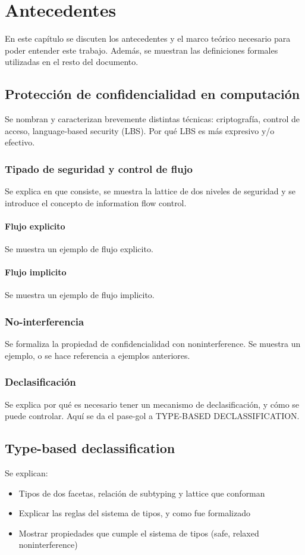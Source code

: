 \chapter{Antecedentes}

En este capítulo se discuten los antecedentes y el marco teórico necesario para poder entender este trabajo. Además, se muestran las definiciones formales utilizadas en el resto del documento.

\section{Protección de confidencialidad en computación}
Se nombran y caracterizan brevemente distintas técnicas: criptografía, control de acceso, language-based security (LBS). Por qué LBS es más expresivo y/o efectivo.

\subsection{Tipado de seguridad y control de flujo}
Se explica en que consiste, se muestra la lattice de dos niveles de seguridad y se introduce el concepto de information flow control.
\subsubsection{Flujo explicito}
Se muestra un ejemplo de flujo explicito.
\subsubsection{Flujo implicito}
Se muestra un ejemplo de flujo implicito.
\subsection{No-interferencia}
Se formaliza la propiedad de confidencialidad con noninterference. Se muestra un ejemplo, o se hace referencia a ejemplos anteriores.

\subsection{Declasificación}
Se explica por qué es necesario tener un mecanismo de declasificación, y cómo se puede controlar. Aquí se da el pase-gol a TYPE-BASED DECLASSIFICATION.
\section{Type-based declassification}
Se explican:
\begin{itemize}
	\item Tipos de dos facetas, relación de subtyping y lattice que conforman
	\item Explicar las reglas del sistema de tipos, y como fue formalizado
	\item Mostrar propiedades que cumple el sistema de tipos (safe, relaxed noninterference)
\end{itemize}


